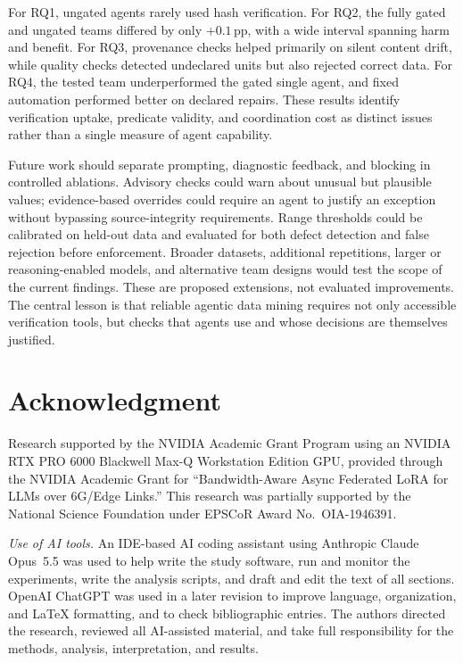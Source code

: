 \documentclass[conference]{IEEEtran}
\begin{document}
For RQ1, ungated agents rarely used hash verification. For RQ2, the fully gated and ungated teams differed by only $+0.1$\,pp, with a wide interval spanning harm and benefit. For RQ3, provenance checks helped primarily on silent content drift, while quality checks detected undeclared units but also rejected correct data. For RQ4, the tested team underperformed the gated single agent, and fixed automation performed better on declared repairs. These results identify verification uptake, predicate validity, and coordination cost as distinct issues rather than a single measure of agent capability.

Future work should separate prompting, diagnostic feedback, and blocking in controlled ablations. Advisory checks could warn about unusual but plausible values; evidence-based overrides could require an agent to justify an exception without bypassing source-integrity requirements. Range thresholds could be calibrated on held-out data and evaluated for both defect detection and false rejection before enforcement. Broader datasets, additional repetitions, larger or reasoning-enabled models, and alternative team designs would test the scope of the current findings. These are proposed extensions, not evaluated improvements. The central lesson is that reliable agentic data mining requires not only accessible verification tools, but checks that agents use and whose decisions are themselves justified.

\section*{Acknowledgment}
Research supported by the NVIDIA Academic Grant Program using an NVIDIA RTX PRO 6000 Blackwell Max-Q Workstation Edition GPU, provided through the NVIDIA Academic Grant for ``Bandwidth-Aware Async Federated LoRA for LLMs over 6G/Edge Links.'' This research was partially supported by the National Science Foundation under EPSCoR Award No.\ OIA-1946391.

\textit{Use of AI tools.} An IDE-based AI coding assistant using Anthropic Claude Opus~5.5 was used to help write the study software, run and monitor the experiments, write the analysis scripts, and draft and edit the text of all sections. OpenAI ChatGPT was used in a later revision to improve language, organization, and LaTeX formatting, and to check bibliographic entries. The authors directed the research, reviewed all AI-assisted material, and take full responsibility for the methods, analysis, interpretation, and results.



\end{document}

